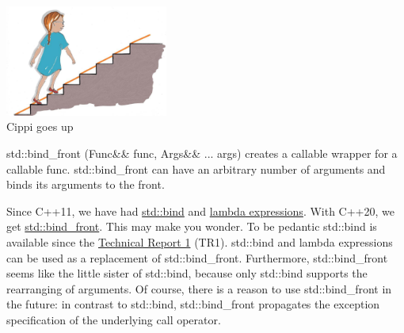 \begin{center}
\includegraphics[width=0.4\textwidth]{content/3/chapter5/images/32.png}\\
Cippi goes up
\end{center}


std::bind\_front (Func\&\& func, Args\&\& ... args) creates a callable wrapper for a callable func. std::bind\_front can have an arbitrary number of arguments and binds its arguments to the front.

\begin{tcolorbox}[colback=blue!5!white,colframe=blue!75!black,title={std::bind\_front versus std::bind}]
	
Since C++11, we have had \href{https://en.cppreference.com/w/cpp/utility/functional/bind}{std::bind} and \href{https://en.cppreference.com/w/cpp/language/lambda}{lambda expressions}. With C++20, we get \href{https://en.cppreference.com/w/cpp/utility/functional/bind_front}{std::bind\_front}. This may make you wonder. To be pedantic std::bind is available since the \href{https://en.wikipedia.org/wiki/C%2B%2B_Technical_Report_1}{Technical Report 1} (TR1). std::bind and lambda expressions can be used as a replacement of std::bind\_front. Furthermore, std::bind\_front seems like the little sister of std::bind, because only std::bind supports the rearranging of arguments. Of course, there is a reason to use std::bind\_front in the future: in contrast to std::bind, std::bind\_front propagates the exception specification of the underlying call operator.
	
\end{tcolorbox}


